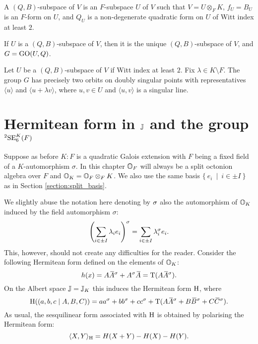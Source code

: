 \begin{definition}
	A $(Q,B)$-subspace of $V$ is an $F$-subspace $U$ of $V$ such that \mbox{$V = U \otimes_F K$}, 
	$f_U = B_U$ is an $F$-form on $U$, and $Q_U$ is a non-degenerate quadratic form on $U$ of 
	Witt index at least $2$. 
\end{definition}

\begin{proposition}
	\label{prop:3_2forms}
	If $U$ is a $(Q,B)$-subspace of $V$, then it is the unique $(Q,B)$-subspace of $V$, and
	$G = \mathrm{GO}(U,Q)$. 
\end{proposition}

\begin{proposition}
	\label{prop:3_2forms_orbits}
	Let $U$ be a $(Q,B)$-subspace of $V$ if Witt index at least $2$. Fix
	\mbox{$\lambda \in K
	\setminus F$}. The group $G$ has 
	precisely two orbits on doubly singular points with representatives
	$\langle u \rangle$ and \mbox{$\langle u + \lambda v \rangle$}, where $u,v \in U$ and 
	\mbox{$\langle u, v \rangle$} 	is a singular line. 
\end{proposition}

\section{Hermitean form in $\mathbb{J}$ and the group ${}^2\mathrm{SE}_6^K(F)$}

Suppose as before $K : F$ is a quadratic Galois extension with $F$ being a fixed field of a
$K$-automorphism $\sigma$. In this chapter $\mathbb{O}_F$ will always be a split octonion algebra 
over $F$ and $\mathbb{O}_K = \mathbb{O}_F \otimes_F K$. We also use the same basis 
$\{\ e_i\ \mid\ i \in \pm I\ \}$ as in Section \ref{section:split_basis}.

We slightly abuse the notation here denoting by $\sigma$ also the automorphism of $\mathbb{O}_K$ induced by 
the field automorphism $\sigma$:
\begin{equation}
	\left( \sum_{i\in \pm I} \lambda_i e_i \right)^{\sigma} = 
	\sum_{i\in \pm I} \lambda_{i}^{\sigma} e_i. 
\end{equation}
This, however, should not create any difficulties for the reader. 
Consider the following Hermitean form defined on the elements of $\mathbb{O}_K$:
\begin{equation}
	h(x) = A \ovA^{\s} + A^{\s} \ovA = \Tr(A \ovA^{\s}).
\end{equation}
On the Albert space $\mathbb{J} = \mathbb{J}_K$ this induces the Hermitean form $\mathrm{H}$, where
\begin{equation}
	\H( (a,b,c\mid A,B,C) ) = 
		a a^{\s} + b b^{\s} + c c^{\s} + 
		\Tr(A \ovA^{\s} + B\ovB^{\s} + C\ovC^{\s}).
\end{equation}
As usual, the sesquilinear form associated with $\mathrm{H}$ is obtained by polarising the Hermitean form:
\begin{equation}
	\langle X, Y \rangle_{\mathrm{H}} = H(X+Y) - H(X) - H(Y).
\end{equation}

